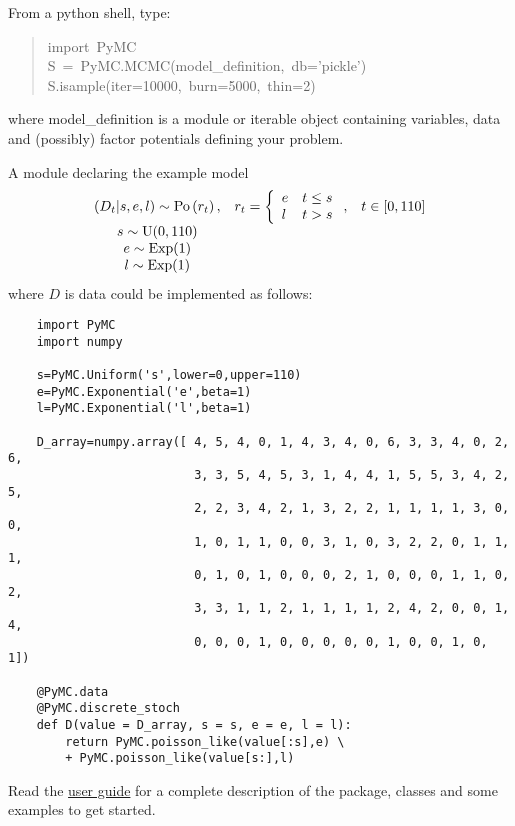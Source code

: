 From a python shell, type:
\begin{quote}{\ttfamily \raggedright \noindent
import~PyMC~\\
S~=~PyMC.MCMC(model{\_}definition,~db='pickle')~\\
S.isample(iter=10000,~burn=5000,~thin=2)
}\end{quote}
where model{\_}definition is a module or iterable object containing variables, data and (possibly) factor potentials defining your problem. 

A module declaring the example model
\begin{eqnarray*}
        \begin{array}{ccc}
            (D_t | s, e, l) \sim \textup{Po}\left(r_t\right), & r_t=\left\{\begin{array}{ll}
                e & t\le s\\ l & t>s
                \end{array}\right.,&t\in[0,110]\\
            s\sim \textup{U}(0,110)\\
            e\sim \textup{Exp}(1)\\
            l\sim \textup{Exp}(1)        
        \end{array}
        \label{disastermodel} 
\end{eqnarray*}
where $D$ is data could be implemented as follows:
\begin{verbatim}
    import PyMC
    import numpy

    s=PyMC.Uniform('s',lower=0,upper=110)
    e=PyMC.Exponential('e',beta=1)
    l=PyMC.Exponential('l',beta=1)

    D_array=numpy.array([ 4, 5, 4, 0, 1, 4, 3, 4, 0, 6, 3, 3, 4, 0, 2, 6,
                          3, 3, 5, 4, 5, 3, 1, 4, 4, 1, 5, 5, 3, 4, 2, 5,
                          2, 2, 3, 4, 2, 1, 3, 2, 2, 1, 1, 1, 1, 3, 0, 0,
                          1, 0, 1, 1, 0, 0, 3, 1, 0, 3, 2, 2, 0, 1, 1, 1,
                          0, 1, 0, 1, 0, 0, 0, 2, 1, 0, 0, 0, 1, 1, 0, 2,
                          3, 3, 1, 1, 2, 1, 1, 1, 1, 2, 4, 2, 0, 0, 1, 4,
                          0, 0, 0, 1, 0, 0, 0, 0, 0, 1, 0, 0, 1, 0, 1])

    @PyMC.data
    @PyMC.discrete_stoch
    def D(value = D_array, s = s, e = e, l = l):
        return PyMC.poisson_like(value[:s],e) \
        + PyMC.poisson_like(value[s:],l)
\end{verbatim}
Read the \href{docs/pdf/new_interface.pdf}{user guide} for a
complete description of the package, classes and some examples to get started.


